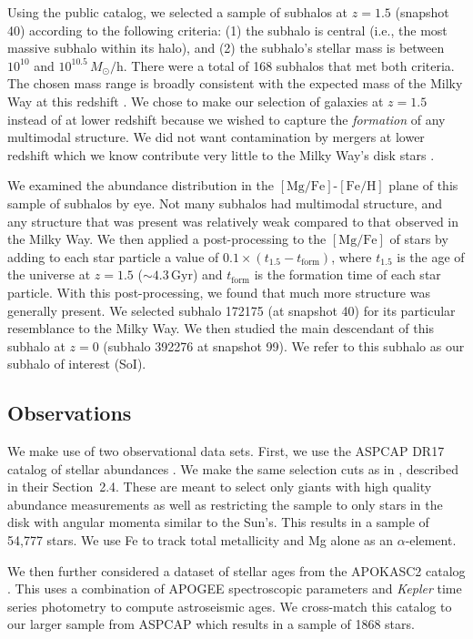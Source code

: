 \documentclass[linenumbers, twocolumn]{aastex631}
\newcommand{\Msun}{\ensuremath{M_{\odot}}}
\newcommand{\Gyr}{\ensuremath{\textrm{Gyr}}}
\newcommand{\FeH}{\ensuremath{[\textrm{Fe}/\textrm{H}]}}
\newcommand{\MgFe}{\ensuremath{[\textrm{Mg}/\textrm{Fe}]}}
\begin{document}
Using the public catalog, we selected a sample of subhalos at $z=1.5$ (snapshot 40) according to the following criteria: (1) the subhalo is central (i.e., the most massive subhalo within its halo), and (2) the subhalo's stellar mass is between $10^{10}$ and $10^{10.5}\,\Msun/\textrm{h}$. There were a total of 168 subhalos that met both criteria. The chosen mass range is broadly consistent with the expected mass of the Milky Way at this redshift \citep{2013ApJ...771L..35V}. We chose to make our selection of galaxies at $z=1.5$ instead of at lower redshift because we wished to capture the \textit{formation} of any multimodal structure. We did not want contamination by mergers at lower redshift which we know contribute very little to the Milky Way's disk stars \citep[e.g.,][]{2016ARA&A..54..529B}.

We examined the abundance distribution in the \MgFe{}-\FeH{} plane of this sample of subhalos by eye. Not many subhalos had multimodal structure, and any structure that was present was relatively weak compared to that observed in the Milky Way. We then applied a post-processing to the \MgFe{} of stars by adding to each star particle a value of $0.1\times\left(t_{1.5}-t_{\textrm{form}}\right)$, where $t_{1.5}$ is the age of the universe at $z=1.5$ ($\sim4.3\,\Gyr$) and $t_{\textrm{form}}$ is the formation time of each star particle. With this post-processing, we found that much more structure was generally present. We selected subhalo 172175 (at snapshot 40) for its particular resemblance to the Milky Way. We then studied the main descendant of this subhalo at $z=0$ (subhalo 392276 at snapshot 99). We refer to this subhalo as our subhalo of interest (SoI).

\subsection{Observations}\label{ssec:obs}
We make use of two observational data sets. First, we use the ASPCAP DR17 catalog of stellar abundances \citep[][J.A.~Holtzman et al., in preparation]{2016AJ....151..144G}. We make the same selection cuts as in \citet{2024arXiv240707985B}, described in their Section~2.4. These are meant to select only giants with high quality abundance measurements as well as restricting the sample to only stars in the disk with angular momenta similar to the Sun's. This results in a sample of 54,777 stars. We use Fe to track total metallicity and Mg alone as an $\alpha$-element.

We then further considered a dataset of stellar ages from the APOKASC2 catalog \citep{2018ApJS..239...32P}. This uses a combination of APOGEE spectroscopic parameters and \textit{Kepler} time series photometry to compute astroseismic ages. We cross-match this catalog to our larger sample from ASPCAP which results in a sample of 1868 stars.
\end{document}
